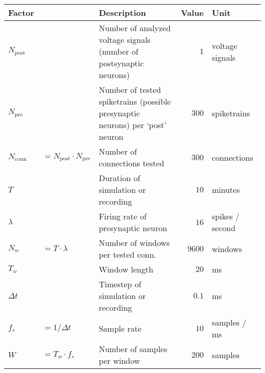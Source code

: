 \begin{tabular}{l l l r l}
    Factor &               & Description                           & Value  & Unit            \\
    \toprule
    $ N_\mathrm{post} $&$ $& \makecell[l]{Number of analyzed voltage signals\\
        (number of postsynaptic neurons)}                          &$   1  $& voltage signals \\[0.8em]

    $ N_\mathrm{pre}  $&$ $& \makecell[l]{Number of tested spiketrains (possible\\
        presynaptic neurons) per `post' neuron }                   &$ 300  $& spiketrains     \\[0.8em]

    $ N_\mathrm{conn} $&$ = N_\mathrm{post} · N_\mathrm{pre} $&
        Number of connections tested                               &$ 300  $& connections     \\

    \midrule
    $ T   $&$             $& Duration of simulation or recording   &$  10  $& minutes         \\
    $ λ   $&$             $& Firing rate of presynaptic neuron     &$  16  $& spikes / second \\
    $ N_w $&$ = T · λ     $& Number of windows per tested conn.    &$ 9600 $& windows         \\
    \midrule
    $ T_w $&$             $& Window length                         &$  20  $& ms              \\
    $ Δt  $&$             $& Timestep of simulation or recording   &$  0.1 $& ms              \\
    $ f_s $&$ = 1 / Δt    $& Sample rate                           &$  10  $& samples / ms    \\
    $ W   $&$ = T_w · f_s $& Number of samples per window          &$  200 $& samples         \\
    \bottomrule
\end{tabular}
